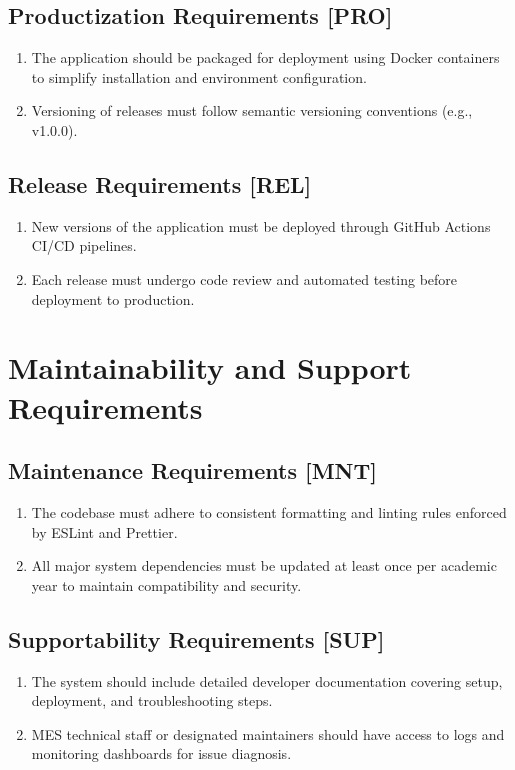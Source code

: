 \documentclass[12pt]{article}
\begin{document}
\begin{enumerate}
  \subsection{Productization Requirements [PRO]}
    \begin{enumerate}
      \item The application should be packaged for deployment using Docker containers to simplify installation and environment configuration.
      \item Versioning of releases must follow semantic versioning conventions (e.g., v1.0.0).
    \end{enumerate}

  \subsection{Release Requirements [REL]}
    \begin{enumerate}
      \item New versions of the application must be deployed through GitHub Actions CI/CD pipelines.
      \item Each release must undergo code review and automated testing before deployment to production.
    \end{enumerate}

\section{Maintainability and Support Requirements}

\subsection{Maintenance Requirements [MNT]}
\begin{enumerate}
    \item The codebase must adhere to consistent formatting and linting rules enforced by ESLint and Prettier.
    \item All major system dependencies must be updated at least once per academic year to maintain compatibility and security.
\end{enumerate}

\subsection{Supportability Requirements [SUP]}
\begin{enumerate}
    \item The system should include detailed developer documentation covering setup, deployment, and troubleshooting steps.
    \item MES technical staff or designated maintainers should have access to logs and monitoring dashboards for issue diagnosis.
\end{enumerate}


\end{enumerate}
\end{document}
